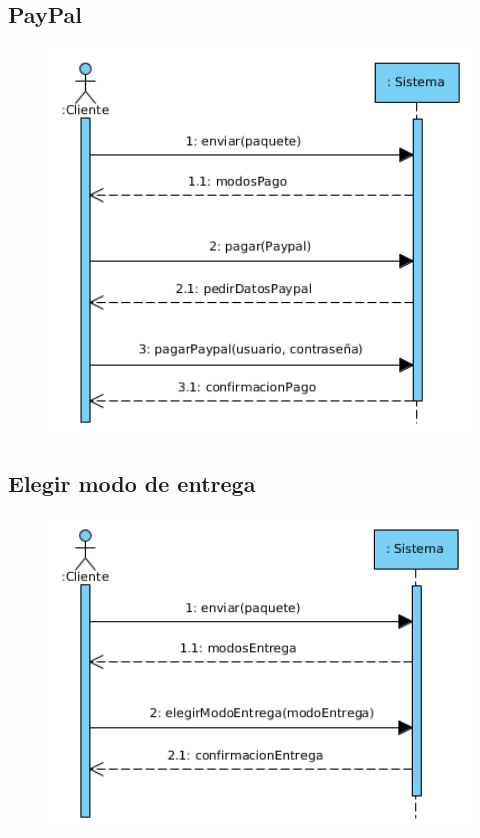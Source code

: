 \subsection{PayPal}
\begin{figure}[H]
	\centering
	\includegraphics[width=16cm]{58}
\end{figure}
\subsection{Elegir modo de entrega}
\begin{figure}[H]
	\centering
	\includegraphics[width=16cm]{59}
\end{figure}
